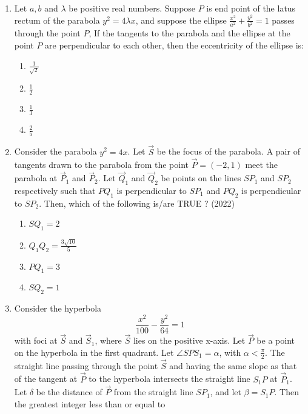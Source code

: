 \begin{enumerate}[label=\thesubsection.\arabic*.,ref=\thesubsection.\theenumi]
\item   Let $a, b$ and $\lambda$ be positive real numbers. Suppose $P$ is end point of the latus rectum of the parabola $y^2 = 4\lambda x$, and suppose the ellipse $\frac{x^2}{a^2} + \frac{y^2}{b^2} = 1$ passes through the point $P$, If the tangents to the parabola and the ellipse at the point $P$ are perpendicular to each other, then the eccentricity of the ellipse is:
     \hfill{}
\begin{multicols}{4}
    \begin{enumerate}
        \item  $\frac{1}{\sqrt{2}}$
        \item  $\frac{1}{2}$
        \item  $\frac{1}{3}$
        \item  $\frac{2}{5}$
    \end{enumerate}
\end{multicols}
 \item Consider the parabola $y^2 = 4x$. Let $\vec{S}$ be the focus of the parabola. A pair of tangents drawn to the 
parabola from the point $\vec{P} = (-2, 1)$ meet the parabola at $\vec{P}_1$ and $\vec{P}_2$. Let $\vec{Q}_1$ and $\vec{Q}_2$ be points on the 
lines $SP_1$ and $SP_2$ respectively such that $PQ_1$ is perpendicular to $SP_1$ and $PQ_2$ is perpendicular to 
$SP_2$. Then, which of the following is/are TRUE ?
	\hfill (2022)
\begin{multicols}{4}
\begin{enumerate}
 \item $SQ_1=2$
 \item $Q_1Q_2=\frac{3\sqrt{10}}{5}$
 \item $PQ_1=3$
 \item $SQ_2=1$
\end{enumerate}
\end{multicols}
\item Consider the hyperbola  
$$\frac{x^2}{100} - \frac{y^2}{64} = 1$$
with foci at $\vec{S}$ and $\vec{S}_1$, where $\vec{S}$ lies on the positive x-axis. Let $\vec{P}$ be a point on the hyperbola in the first quadrant. Let $\angle S P S_1 = \alpha$, with $\alpha < \frac{\pi}{2}$.  
The straight line passing through the point $\vec{S}$ and having the same slope as that of the tangent at $\vec{P}$ to the hyperbola intersects the straight line $S_1 P$ at $\vec{P}_1$.  
Let $\delta$ be the distance of $\vec{P}$ from the straight line $S P_1$, and let $\beta = S_1 P$.  
Then the greatest integer less than or equal to  
		\begin{align*}

\end{align*}
\end{enumerate}
